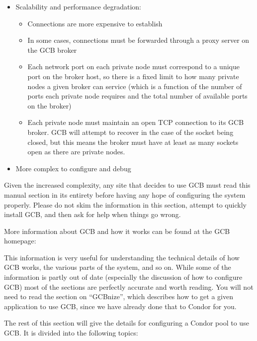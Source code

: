 \begin{itemize}
\item Scalability and performance degradation: 
  \begin{itemize}
  \item Connections are more expensive to establish
  \item In some cases, connections must be forwarded through a proxy
    server on the GCB broker
  \item Each network port on each private node must correspond to a
    unique port on the broker host, so there is a fixed limit to how
    many private nodes a given broker can service (which is a function
    of the number of ports each private node requires and the total
    number of available ports on the broker)
  \item Each private node must maintain an open TCP connection to its
    GCB broker.  GCB will attempt to recover in the case of the socket
    being closed, but this means the broker must have at least as many
    sockets open as there are private nodes.
  \end{itemize}

\item More complex to configure and debug

\end{itemize}

Given the increased complexity, any site that decides to use GCB must
read this manual section in its entirety before having any hope of
configuring the system properly.
Please do not skim the information in this section, attempt to quickly
install GCB, and then ask for help when things go wrong.

More information about GCB and how it works can be found at the GCB
homepage:


This information is very useful for understanding the technical
details of how GCB works, the various parts of the system, and so on.
While some of the information is partly out of date (especially the
discussion of how to configure GCB) most of the sections are perfectly
accurate and worth reading.
You will not need to read the section on ``GCBnize'', which describes
how to get a given application to use GCB, since we have already done
that to Condor for you.

The rest of this section will give the details for configuring a
Condor pool to use GCB.
It is divided into the following topics:

